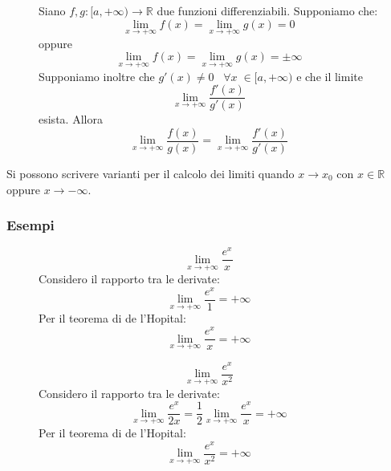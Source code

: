 \documentclass[a4paper]{article}
\theoremstyle{break}
\theoremstyle{break}
\theoremstyle{break}
\theoremstyle{break}
\begin{document}
\begin{figure}[H]
  \begin{definition}
    Siano \( f,g: [a,+\infty) \to \mathbb{R} \) due funzioni differenziabili. Supponiamo che:
    \[
      \lim_{x \to +\infty} f(x) = \lim_{x \to +\infty} g(x) = 0
    \] 
    oppure
    \[
      \lim_{x \to +\infty} f(x) = \lim_{x \to +\infty} g(x) = \pm \infty
    \] 
    Supponiamo inoltre che \( g'(x) \neq 0\;\;\; \forall x\; \in  [a,+\infty)  \) e che il
    limite
    \[
      \lim_{x \to +\infty} \frac{f'(x)}{g'(x)} 
    \] 
    esista. Allora
    \[ \lim_{x \to +\infty} \frac{f(x)}{g(x)} = \lim_{x \to +\infty} \frac{f'(x)}{g'(x)}  \]
  \end{definition}
\end{figure}
Si possono scrivere varianti per il calcolo dei limiti quando \( x \to x_0 \) con \( x \in \mathbb{R} \) 
oppure \( x \to -\infty \).

\subsubsection{Esempi}
\begin{figure}[H]
  \begin{example}
    \[
      \lim_{x \to +\infty} \frac{e^x}{x}
    \] 
    Considero il rapporto tra le derivate:
    \[
      \lim_{x \to +\infty} \frac{e^x}{1} = +\infty
    \] 
    Per il teorema di de l'Hopital:
    \[
      \lim_{x \to +\infty} \frac{e^x}{x} = +\infty
    \] 
  \end{example}
\end{figure}

\begin{figure}[H]
  \begin{example}
    \[
      \lim_{x \to +\infty} \frac{e^x}{x^2}
    \] 
    Considero il rapporto tra le derivate:
    \[
      \lim_{x \to +\infty} \frac{e^x}{2x} = \frac{1}{2} \lim_{x \to +\infty} \frac{e^x}{x} = +\infty
    \] 
    Per il teorema di de l'Hopital:
    \[
      \lim_{x \to +\infty} \frac{e^x}{x^2} = +\infty
    \] 
  \end{example}
\end{figure}
\end{document}
